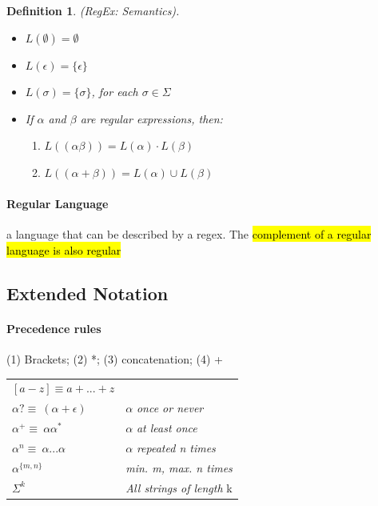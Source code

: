 \documentclass[a3paper, 8pt]{extarticle}
\newtheorem*{definition}{Definition}
\begin{document}
\begin{multicols*}{6}
    
    \begin{definition} (RegEx: Semantics).\begin{itemize}
        \item $L(\emptyset) = \emptyset$
        \item $L(\epsilon) = \{\epsilon \}$
        \item $L(\sigma) = \{\sigma \}$, for each $\sigma \in \Sigma$
        \item If $\alpha$ and $\beta$ are regular expressions, then: \begin{enumerate}
            \item[] $L((\alpha \beta)) = L(\alpha) \cdot L(\beta)$
            \item[]  $L((\alpha +  \beta)) = L(\alpha) \cup L(\beta)$
        \end{enumerate}
    \end{itemize}
    \end{definition}
    
    \paragraph{Regular Language} a language that can be described by a regex. The \hl{complement of a regular language is also regular}

\subsection{Extended Notation}
 \paragraph{Precedence rules}
 (1) Brackets; (2) *; (3) concatenation; (4) +

\begin{tabular}{l l}
    $[a-z] \equiv a + ... + z$ &  \\
    $\alpha? \equiv\: (\alpha + \epsilon)$ & $\alpha$ \textit{ once or never}\\
    $\alpha^+ \equiv\: \alpha\alpha^*$ & $\alpha$ \textit{ at least once} \\
    $\alpha^n \equiv\: \alpha...\alpha$ & $\alpha$ \textit{ repeated n times} \\
    $\alpha^{\{m,n\}}$ & \textit{min. m, max. n times} \\
    $\Sigma^k$ & \textit{All strings of length } k

\end{tabular}


\end{multicols*}
\end{document}
